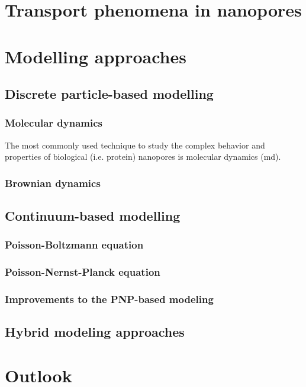 \section{Transport phenomena in nanopores}


\section{Modelling approaches}

\subsection{Discrete particle-based modelling}

\subsubsection{Molecular dynamics}
The most commonly used technique to study the complex behavior and properties of biological (i.e. protein) nanopores is molecular dynamics (\gls{md}).

\subsubsection{Brownian dynamics}




\subsection{Continuum-based modelling}

\subsubsection{Poisson-Boltzmann equation}

\subsubsection{Poisson-Nernst-Planck equation}

\subsubsection{Improvements to the PNP-based modeling}

\subsection{Hybrid modeling approaches}

\section{Outlook}


